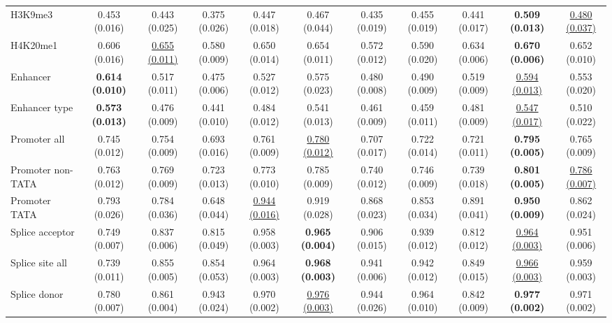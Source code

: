 \begin{table*}[!htb]
{\begin{tabular}{lcccccccccc}
H3K9me3        & 0.453 (0.016) & 0.443 (0.025) & 0.375 (0.026) & 0.447 (0.018) & 0.467 (0.044) & 0.435 (0.019) & 0.455 (0.019) & 0.441 (0.017) & \textbf{0.509 (0.013)} & \underline{0.480 (0.037)} \\
H4K20me1       & 0.606 (0.016) & \underline{0.655 (0.011)} & 0.580 (0.009) & 0.650 (0.014) & 0.654 (0.011) & 0.572 (0.012) & 0.590 (0.020) & 0.634 (0.006) & \textbf{0.670 (0.006)} & 0.652 (0.010) \\
Enhancer       & \textbf{0.614 (0.010)} & 0.517 (0.011) & 0.475 (0.006) & 0.527 (0.012) & 0.575 (0.023) & 0.480 (0.008) & 0.490 (0.009) & 0.519 (0.009) & \underline{0.594 (0.013)} & 0.553 (0.020) \\
Enhancer type & \textbf{0.573 (0.013)} & 0.476 (0.009) & 0.441 (0.010) & 0.484 (0.012) & 0.541 (0.013) & 0.461 (0.009) & 0.459 (0.011) & 0.481 (0.009) & \underline{0.547 (0.017)} & 0.510 (0.022) \\
Promoter all   & 0.745 (0.012) & 0.754 (0.009) & 0.693 (0.016) & 0.761 (0.009) & \underline{0.780 (0.012)} & 0.707 (0.017) & 0.722 (0.014) & 0.721 (0.011) & \textbf{0.795 (0.005)} & 0.765 (0.009) \\
Promoter non-TATA & 0.763 (0.012) & 0.769 (0.009) & 0.723 (0.013) & 0.773 (0.010) & 0.785 (0.009) & 0.740 (0.012) & 0.746 (0.009) & 0.739 (0.018) & \textbf{0.801 (0.005)} & \underline{0.786 (0.007)} \\
Promoter TATA  & 0.793 (0.026) & 0.784 (0.036) & 0.648 (0.044) & \underline{0.944 (0.016)} & 0.919 (0.028) & 0.868 (0.023) & 0.853 (0.034) & 0.891 (0.041) & \textbf{0.950 (0.009)} & 0.862 (0.024) \\
Splice acceptor & 0.749 (0.007) & 0.837 (0.006) & 0.815 (0.049) & 0.958 (0.003) & \textbf{0.965 (0.004)} & 0.906 (0.015) & 0.939 (0.012) & 0.812 (0.012) & \underline{0.964 (0.003)} & 0.951 (0.006) \\
Splice site all & 0.739 (0.011) & 0.855 (0.005) & 0.854 (0.053) & 0.964 (0.003) & \textbf{0.968 (0.003)} & 0.941 (0.006) & 0.942 (0.012) & 0.849 (0.015) & \underline{0.966 (0.003)} & 0.959 (0.003) \\
Splice donor   & 0.780 (0.007) & 0.861 (0.004) & 0.943 (0.024) & 0.970 (0.002) & \underline{0.976 (0.003)} & 0.944 (0.026) & 0.964 (0.010) & 0.842 (0.009) & \textbf{0.977 (0.002)} & 0.971 (0.002) \\
\bottomrule
\end{tabular}
}
\label{tab:nucleotide_transformer_tasks_revised}
\end{table*}